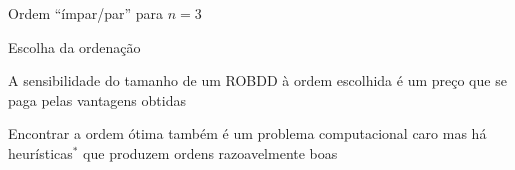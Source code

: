 \expandafter\documentclass\expandafter[table, usenames, svgnames, dvipsnames,14pt, \classopts]{beamer}
\begin{document}
\begin{frame}{Ordem ``ímpar/par'' para $n=3$}
\begin{figure}

    \end{figure}

\end{frame}

\begin{frame}{Escolha da ordenação}

    \begin{outline}
        \1 A sensibilidade do tamanho de um ROBDD à ordem escolhida é um preço que se paga pelas vantagens obtidas
        
        \vspace{1em}
        
        \1 Encontrar a ordem ótima também é um problema computacional caro
            \2[-] mas há heurísticas$^*$ que produzem ordens razoavelmente boas
    \end{outline}
    
    \begin{center}
    \end{center}

\end{frame}
\end{document}
